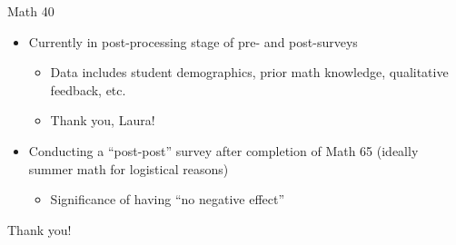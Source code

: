 \documentclass{beamer}
\begin{document}
\begin{frame}{Math 40}\pause
  \begin{itemize}
    \item Currently in post-processing stage of pre- and post-surveys
    \begin{itemize}
      \item Data includes student demographics, prior math knowledge, qualitative feedback, etc.
      \item Thank you, Laura!
    \end{itemize}\pause
    \item Conducting a ``post-post'' survey after completion of Math 65 (ideally summer math for logistical reasons)
    \begin{itemize}
      \item Significance of having ``no negative effect''
    \end{itemize}
  \end{itemize}
\end{frame}
\begin{frame}{Thank you!}
\end{frame}
\end{document}
